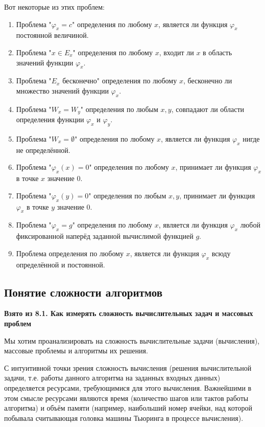 \documentclass[a4paper,12pt]{article}
\begin{document}
Вот некоторые из этих проблем:
\begin{enumerate}
    \item Проблема "\(\varphi_x = c\)" определения по любому \(x\), является ли функция \(\varphi_x\) постоянной величиной.
    \item Проблема "\(x \in E_x\)" определения по любому \(x\), входит ли \(x\) в область значений функции \(\varphi_x\).
    \item Проблема "\(E_x\) бесконечно" определения по любому \(x\), бесконечно ли множество значений функции \(\varphi_x\).
    \item Проблема "\(W_x = W_y\)" определения по любым \(x, y\), совпадают ли области определения функции \(\varphi_x\) и \(\varphi_y\).
    \item Проблема "\(W_x = \emptyset\)" определения по любому \(x\), является ли функция \(\varphi_x\) нигде не определённой.
    \item Проблема "\(\varphi_x(x) = 0\)" определения по любому \(x\), принимает ли функция \(\varphi_x\) в точке \(x\) значение 0.
    \item Проблема "\(\varphi_x(y) = 0\)" определения по любым \(x, y\), принимает ли функция \(\varphi_x\) в точке \(y\) значение 0.
    \item Проблема "\(\varphi_x = g\)" определения по любому \(x\), является ли функция \(\varphi_x\) любой фиксированной наперёд заданной вычислимой функцией \(g\).
    \item Проблема определения по любому \(x\), является ли функция \(\varphi_x\) всюду определённой и постоянной.
\end{enumerate}

\subsection{Понятие сложности алгоритмов}

\textbf{Взято из 8.1. Как измерять сложность вычислительных задач и массовых проблем}

Мы хотим проанализировать на сложность вычислительные задачи (вычисления), массовые проблемы и алгоритмы их решения.

С интуитивной точки зрения сложность вычисления (решения вычислительной задачи, т.е. работы данного алгоритма на заданных входных данных) определяется ресурсами, требующимися для этого вычисления. Важнейшими в этом смысле ресурсами являются время (количество шагов или тактов работы алгоритма) и объём памяти (например, наибольший номер ячейки, над которой побывала считывающая головка машины Тьюринга в процессе вычисления).
\end{document}
